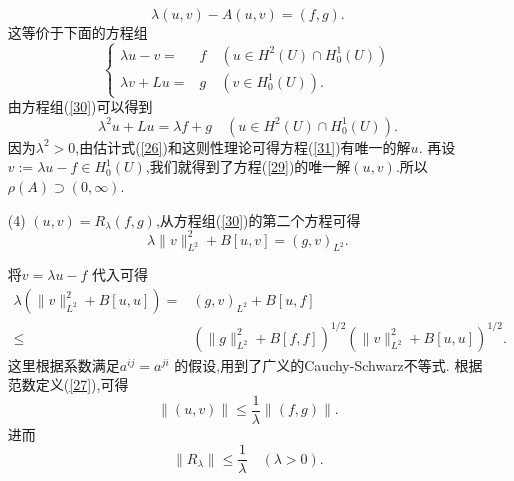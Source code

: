 \begin{frame}[t]
  \begin{enumerate}
    \item []
      \begin{equation}\label{29}
      \lambda(u,v)-A(u,v)=(f,g).
    \end{equation}
    这等价于下面的方程组
    \begin{equation}\label{30}
      \left\{
	\begin{aligned}
	  \lambda u-v=&f \quad \left( u\in H^2(U)\cap H_0^{1}(U) \right) \\
	  \lambda v +Lu=&g\quad \left(v\in H_0^{1}(U)  \right) .
	\end{aligned}
	\right.
    \end{equation}
    由方程组(\ref{30})可以得到
    \begin{equation}\label{31}
      \lambda^2u+Lu=\lambda f+g \quad \left( u\in H^2(U)\cap H_0^{1}(U) \right) .
    \end{equation}
    因为$\lambda^2>0$,由估计式(\ref{26})和这则性理论可得方程(\ref{31})有唯一的解$u$. 再设 $v:=\lambda u -f\in H_0^{1}(U)$,我们就得到了方程(\ref{29})的唯一解$(u,v)$.所以$\rho(A)\supset (0,\infty)$.
  \item [(4)] $(u,v)=R_\lambda(f,g)$,从方程组(\ref{30})的第二个方程可得
    \[
      \lambda \|v\|^2_{L^2}+B[u,v]=(g,v)_{L^2}.
    \] 
  \end{enumerate}
\end{frame}

\begin{frame}[t]
  \begin{enumerate}
  \item [] 将$v=\lambda u-f$ 代入可得
    \begin{align*}
      \lambda \left( \|v\|^2_{L^2}+B[u,u] \right) =& (g,v)_{L^2}+B[u,f]\\
      \le & \left( \|g\|_{L^2}^2+B[f,f] \right) ^{1 /2}\left( \|v\|^2_{L^2}+B[u,u] \right) ^{1 /2}  
    .\end{align*}
    这里根据系数满足$a^{ij}=a^{ji}$ 的假设,用到了广义的Cauchy-Schwarz不等式.
    根据范数定义(\ref{27}),可得
    \[
      \|(u,v)\|\le \frac{1}{\lambda}\|(f,g)\|.
    \] 进而
    \[
      \|R_\lambda\|\le \frac{1}{\lambda}\quad (\lambda>0).
    \] 
\end{enumerate}
\end{frame}


